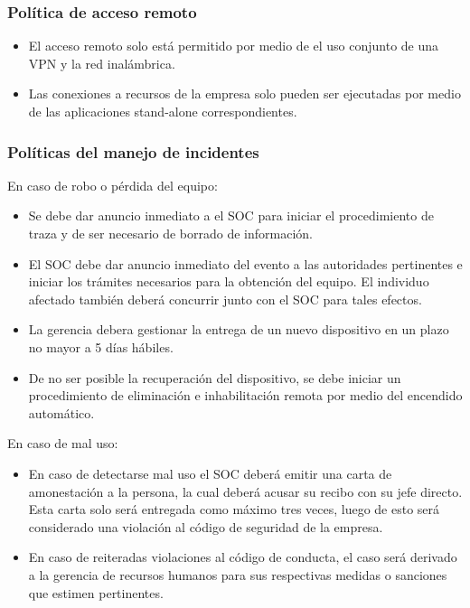 \documentclass[11pt]{utalcaDoc}
\begin{document}
\subsubsection{Política de acceso remoto}
\begin{itemize}
    \item El acceso remoto solo está permitido por medio de el uso conjunto de una VPN y la red inalámbrica.
    \item Las conexiones a recursos de la empresa solo pueden ser ejecutadas por medio de las aplicaciones stand-alone correspondientes.
\end{itemize}

\subsubsection{Políticas del manejo de incidentes}
En caso de robo o pérdida del equipo:
\begin{itemize}
    \item Se debe dar anuncio inmediato a el SOC para iniciar el procedimiento de traza y de ser necesario de borrado de información.
    \item El SOC debe dar anuncio inmediato del evento a las autoridades pertinentes e iniciar los trámites necesarios para la obtención del equipo. El individuo afectado también deberá concurrir junto con el SOC para tales efectos.
    \item La gerencia debera gestionar la entrega de un nuevo dispositivo en un plazo no mayor a 5 días hábiles.
    \item De no ser posible la recuperación del dispositivo, se debe iniciar un procedimiento de eliminación e inhabilitación remota por medio del encendido automático.
\end{itemize}

En caso de mal uso:
\begin{itemize}
    \item En caso de detectarse mal uso el SOC deberá emitir una carta de amonestación a la persona, la cual deberá acusar su recibo con su jefe directo. Esta carta solo será entregada como máximo tres veces, luego de esto será considerado una violación al código de seguridad de la empresa.
    \item En caso de reiteradas violaciones al código de conducta, el caso será derivado a la gerencia de recursos humanos para sus respectivas medidas o sanciones que estimen pertinentes.
\end{itemize}
\end{document}
